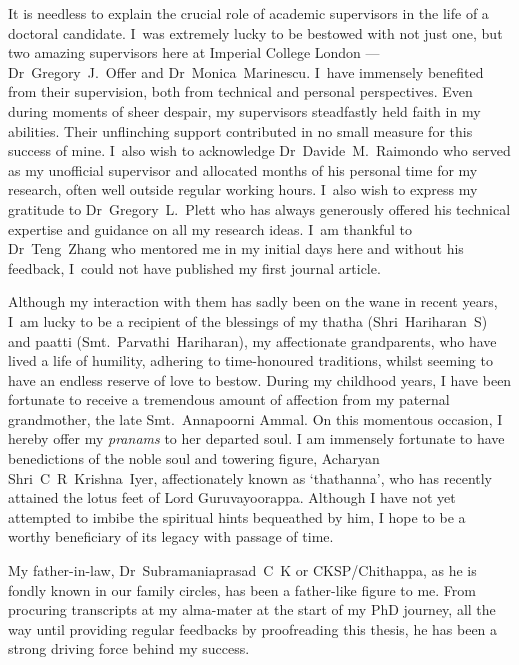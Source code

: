 
It is needless to explain the crucial role of academic supervisors in the life
of a doctoral candidate. I~was extremely lucky to be bestowed with not just one,
but two amazing supervisors here at Imperial College London --- \mbox{Dr Gregory
J.\ Offer} and \mbox{Dr Monica Marinescu}. I~have immensely benefited from their
supervision, both from technical and personal perspectives. Even during moments
of sheer despair, my supervisors steadfastly held faith in my abilities. Their
unflinching support contributed in no small measure for this success of mine.
I~also wish to acknowledge \mbox{Dr Davide M.\ Raimondo} who served as my
unofficial supervisor and allocated months of his personal time for my research,
often well outside regular working hours. I~also wish to express my gratitude to
\mbox{Dr Gregory L.\ Plett} who has always generously offered his technical
expertise and guidance on all my research ideas. I~am thankful to \mbox{Dr Teng
Zhang} who mentored me in my initial days here and without his feedback, I~could
not have published my first journal article.

Although my interaction with them has sadly been on the wane in recent years,
I~am lucky to be a recipient of the blessings of my thatha \mbox{(Shri~Hariharan
S)} and paatti \mbox{(Smt.\ Parvathi Hariharan)}, my affectionate grandparents,
who have lived a life of humility, adhering to time-honoured traditions, whilst
seeming to have an endless reserve of love to bestow. During my childhood years,
I have been fortunate to receive a tremendous amount of affection from my
paternal grandmother, the late Smt.~Annapoorni Ammal. On this momentous
occasion, I hereby offer my \emph{pranams} to her departed soul.  I am immensely
fortunate  to have benedictions of the noble soul and towering figure, Acharyan
\mbox{Shri C R Krishna Iyer}, affectionately known as `thathanna', who has
recently attained the lotus feet of Lord Guruvayoorappa. Although I have not yet
attempted to imbibe the spiritual hints bequeathed by him, I hope to be a worthy
beneficiary of its legacy with passage of time.

My father-in-law, \mbox{Dr Subramaniaprasad C K} or CKSP/Chithappa, as he is
fondly known in our family circles, has been a father-like figure to me. From
procuring transcripts at my alma-mater at the start of my PhD journey, all the
way until providing regular feedbacks by proofreading this thesis, he has been a
strong driving force behind my success.


